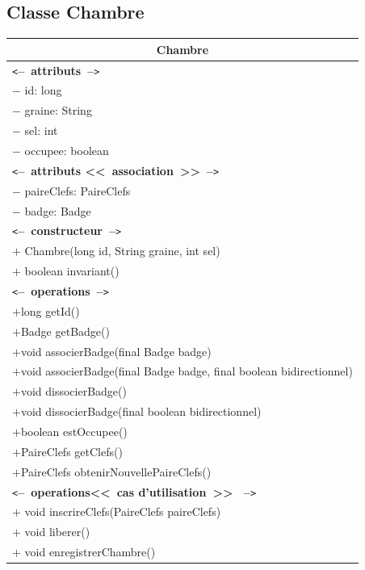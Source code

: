 \documentclass[11pt,article]{article}
\newcommand{\cmt}[1]{\texttt{<}\textbf{--~#1~--}\texttt{>}}
\begin{document}
  \subsection{Classe \textsf{Chambre}}
  \begin{center}
	  \begin{longtable}{|p{15cm}|}
		  \hline
		  \multicolumn{1}{|c|}{{\Large \textsf{Chambre}}} \\
		  \hline
		  \cmt{attributs}\\
		  $-$ id: long \\
		  $-$ graine: String \\
		  $-$ sel: int \\
		  $-$ occupee: boolean \\
		  \cmt{attributs <<~association~>>}\\
		  $-$ paireClefs: PaireClefs \\
		  $-$ badge: Badge \\
		  \hline
		  \cmt{constructeur} \\
		  $+$ Chambre(long id, String graine, int sel) \\
		  $+$ boolean invariant() \\
		  \cmt{operations} \\
		  $+$long getId()\\
		  $+$Badge getBadge()\\
		  $+$void associerBadge(final Badge badge)\\
		  $+$void associerBadge(final Badge badge, final boolean bidirectionnel)\\
		  $+$void dissocierBadge()\\
		  $+$void dissocierBadge(final boolean bidirectionnel)\\
		  $+$boolean estOccupee()\\
		  $+$PaireClefs getClefs()\\
		  $+$PaireClefs obtenirNouvellePaireClefs()\\
		   \cmt{operations<<~cas d'utilisation~>> }\\
		  $+$ void inscrireClefs(PaireClefs paireClefs) \\
		  $+$ void liberer() \\
		  $+$ void enregistrerChambre() \\
		  \hline
	  \end{longtable}
  \end{center}
\end{document}
